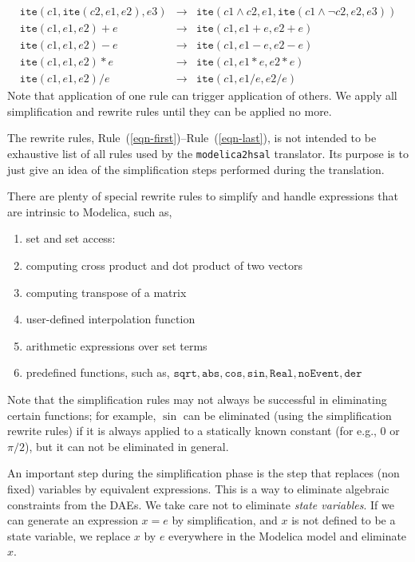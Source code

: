 \documentclass{llncs}
\newcommand\ite{{\mathtt{ite}}}
\begin{document}
\begin{description}
\begin{eqnarray}
 \ite(c1,\ite(c2,e1,e2),e3) & \rightarrow & 
 \ite(c1\wedge c2,e1, \ite(c1 \wedge\neg c2, e2, e3))
\\
 \ite(c1,e1,e2) + e & \rightarrow & \ite(c1,e1+e,e2+e)
\\
 \ite(c1,e1,e2) - e & \rightarrow & \ite(c1,e1-e,e2-e)
\\
 \ite(c1,e1,e2) * e & \rightarrow & \ite(c1,e1*e,e2*e)
\\
 \ite(c1,e1,e2) / e & \rightarrow & \ite(c1,e1/e,e2/e)
\label{eqn-last}
\end{eqnarray}
Note that application of one rule can trigger application of others.
We apply all simplification and rewrite rules until they can be applied
no more.
\end{description}

The rewrite rules, Rule~(\ref{eqn-first})--Rule~(\ref{eqn-last}),
is not intended to be exhaustive list of all rules used by the
{\tt{modelica2hsal}} translator.  Its purpose is to just give an
idea of the simplification steps performed during the translation.

There are plenty of special rewrite rules to simplify and handle expressions
that are intrinsic to Modelica, such as,
\begin{enumerate}
\item set and set access:
\item computing cross product and dot product of two vectors
\item computing transpose of a matrix
\item user-defined interpolation function
\item arithmetic expressions over set terms
\item predefined functions, such as, $\mathtt{sqrt, abs, cos, sin, Real, noEvent, der}$
\end{enumerate}
Note that the simplification rules may not always be successful in eliminating 
certain functions; for example, $\sin$ can be eliminated (using the simplification
rewrite rules) if it is always applied to
a statically known constant (for e.g., $0$ or $\pi/2$), but it can not be eliminated in general.

An important step during the simplification phase is the step that replaces
(non fixed) variables by equivalent expressions.  This is a way to eliminate
algebraic constraints from the DAEs.
We take care not to eliminate {\em{state variables}}.  If we can generate
an expression $x = e$ by simplification, and $x$ is not defined to be a state variable,
we replace $x$ by $e$ everywhere in the Modelica model and eliminate $x$.
\end{document}
